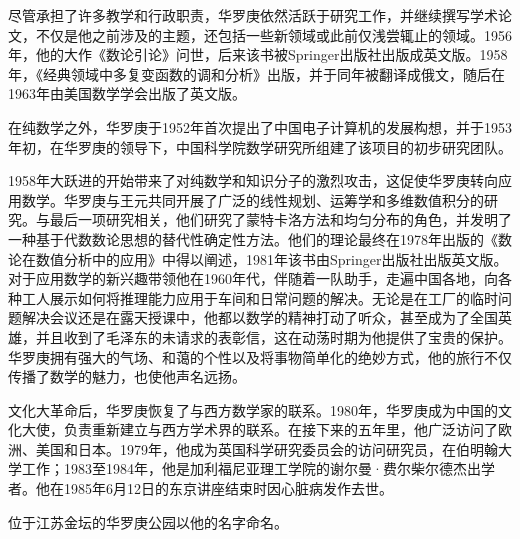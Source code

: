 尽管承担了许多教学和行政职责，华罗庚依然活跃于研究工作，并继续撰写学术论文，不仅是他之前涉及的主题，还包括一些新领域或此前仅浅尝辄止的领域。1956年，他的大作《数论引论》问世，后来该书被Springer出版社出版成英文版。1958年，《经典领域中多复变函数的调和分析》出版，并于同年被翻译成俄文，随后在1963年由美国数学学会出版了英文版。

在纯数学之外，华罗庚于1952年首次提出了中国电子计算机的发展构想，并于1953年初，在华罗庚的领导下，中国科学院数学研究所组建了该项目的初步研究团队。

1958年大跃进的开始带来了对纯数学和知识分子的激烈攻击，这促使华罗庚转向应用数学。华罗庚与王元共同开展了广泛的线性规划、运筹学和多维数值积分的研究。与最后一项研究相关，他们研究了蒙特卡洛方法和均匀分布的角色，并发明了一种基于代数数论思想的替代性确定性方法。他们的理论最终在1978年出版的《数论在数值分析中的应用》中得以阐述，1981年该书由Springer出版社出版英文版。对于应用数学的新兴趣带领他在1960年代，伴随着一队助手，走遍中国各地，向各种工人展示如何将推理能力应用于车间和日常问题的解决。无论是在工厂的临时问题解决会议还是在露天授课中，他都以数学的精神打动了听众，甚至成为了全国英雄，并且收到了毛泽东的未请求的表彰信，这在动荡时期为他提供了宝贵的保护。华罗庚拥有强大的气场、和蔼的个性以及将事物简单化的绝妙方式，他的旅行不仅传播了数学的魅力，也使他声名远扬。

文化大革命后，华罗庚恢复了与西方数学家的联系。1980年，华罗庚成为中国的文化大使，负责重新建立与西方学术界的联系。在接下来的五年里，他广泛访问了欧洲、美国和日本。1979年，他成为英国科学研究委员会的访问研究员，在伯明翰大学工作；1983至1984年，他是加利福尼亚理工学院的谢尔曼·费尔柴尔德杰出学者。他在1985年6月12日的东京讲座结束时因心脏病发作去世。

位于江苏金坛的华罗庚公园以他的名字命名。

